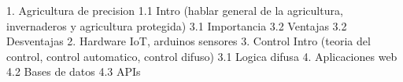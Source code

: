 









1. Agricultura de precision
    1.1 Intro (hablar general de la agricultura, invernaderos y agricultura protegida)
    3.1 Importancia
    3.2 Ventajas
    3.2 Desventajas %
2. Hardware 
    IoT, arduinos sensores
3. Control
    Intro (teoria del control, control automatico, control difuso)
    3.1 Logica difusa
4. Aplicaciones web
    4.2 Bases de datos
    4.3 APIs


